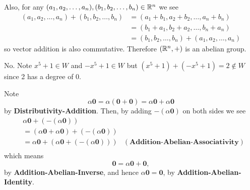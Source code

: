 \begin{questions}
    Also, for any $(a_1, a_2, \dots, a_n), (b_1, b_2, \dots, b_n) \in \mathbb{R}^n$ we see
    \begin{align*}
        (a_1, a_2, \dots, a_n) + (b_1, b_2, \dots, b_n) &= (a_1 + b_1, a_2 + b_2, \dots, a_n + b_n)\\
        &= (b_1+a_1, b_2+a_2, \dots, b_n+a_n)\\
        &= (b_1, b_2, \dots, b_n) + (a_1, a_2, \dots, a_n)
    \end{align*}
    so vector addition is also commutative. Therefore $(\mathbb{R}^n, +)$ is an abelian group.

    \item No. Note $x^5 + 1 \in W$ and $-x^5 + 1 \in W$ but $(x^5+1) + (-x^5+1) = 2 \notin W$ since 2 has a degree of 0.

    \item Note
    \[
        \alpha\mathbf{0} = \alpha(\mathbf{0} + \mathbf{0}) = \alpha\mathbf{0} + \alpha\mathbf{0}
    \]
    by \textbf{Distributivity-Addition}. Then, by adding $-(\alpha\mathbf{0})$ on both sides we see
    \begin{align*}
        &\alpha\mathbf{0} + (-(\alpha\mathbf{0}))\\
        &= (\alpha\mathbf{0} + \alpha\mathbf{0}) + (-(\alpha\mathbf{0}))\\
        &= \alpha\mathbf{0} + (\alpha\mathbf{0} + (-(\alpha\mathbf{0}))) & (\textbf{Addition-Abelian-Associativity})\\
    \end{align*}
    which means
    \[
        \mathbf{0} = \alpha\mathbf{0} + \mathbf{0},
    \]
    by \textbf{Addition-Abelian-Inverse}, and hence $\alpha\mathbf{0} = \mathbf{0}$, by \textbf{Addition-Abelian-Identity}.


\end{questions}
